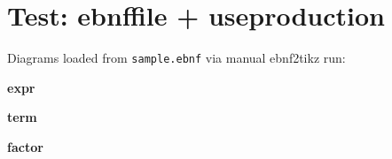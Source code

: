 \documentclass{article}
\begin{document}
\section*{Test: ebnffile + useproduction}

Diagrams loaded from \texttt{sample.ebnf} via manual ebnf2tikz run:

\bigskip
\noindent\textbf{expr}
\par\medskip
{}

\bigskip
\noindent\textbf{term}
\par\medskip
{}

\bigskip
\noindent\textbf{factor}
\par\medskip
{}
\end{document}
